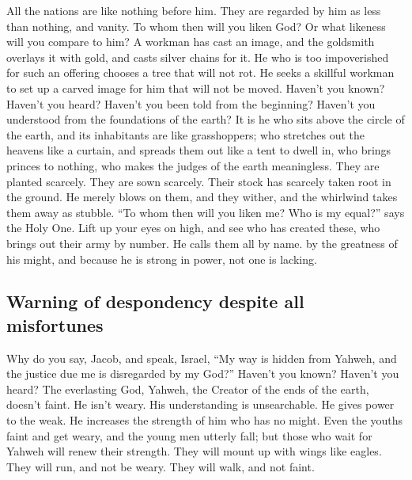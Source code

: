  All the nations are like nothing before him. They are
regarded by him as less than nothing, and vanity.  To
whom then will you liken God? Or what likeness will you compare to him?
 A workman has cast an image, and the goldsmith overlays
it with gold, and casts silver chains for it.  He who is
too impoverished for such an offering chooses a tree that will not rot.
He seeks a skillful workman to set up a carved image for him that will
not be moved.  Haven't you known? Haven't you heard?
Haven't you been told from the beginning? Haven't you understood from
the foundations of the earth?  It is he who sits above
the circle of the earth, and its inhabitants are like grasshoppers; who
stretches out the heavens like a curtain, and spreads them out like a
tent to dwell in,  who brings princes to nothing, who
makes the judges of the earth meaningless.  They are
planted scarcely. They are sown scarcely. Their stock has scarcely taken
root in the ground. He merely blows on them, and they wither, and the
whirlwind takes them away as stubble.  ``To whom then
will you liken me? Who is my equal?'' says the Holy One. 
Lift up your eyes on high, and see who has created these, who brings out
their army by number. He calls them all by name. by the greatness of his
might, and because he is strong in power, not one is lacking.

\hypertarget{warning-of-despondency-despite-all-misfortunes}{%
\subsection{Warning of despondency despite all
misfortunes}\label{warning-of-despondency-despite-all-misfortunes}}

 Why do you say, Jacob, and speak, Israel, ``My way is
hidden from Yahweh, and the justice due me is disregarded by my God?''
 Haven't you known? Haven't you heard? The everlasting
God, Yahweh, the Creator of the ends of the earth, doesn't faint. He
isn't weary. His understanding is unsearchable.  He gives
power to the weak. He increases the strength of him who has no might.
 Even the youths faint and get weary, and the young men
utterly fall;  but those who wait for Yahweh will renew
their strength. They will mount up with wings like eagles. They will
run, and not be weary. They will walk, and not faint.

